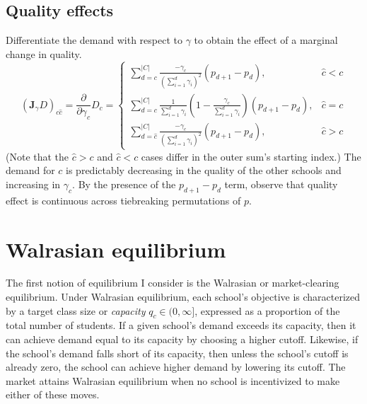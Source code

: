 \documentclass[12pt]{article}
\numberwithin{equation}{subsection}
\theoremstyle{definition}
\begin{document}
\subsection{Quality effects} \label{unconstrainedqualityeffects}
Differentiate the demand with respect to $\gamma$ to obtain the effect of a marginal change in quality.
\begin{equation} \label{jac-gamma-demand-uncons}
\left(\mathbf{J}_\gamma D \right)_{c\hat c} =
\frac{\partial}{\partial\gamma_{\hat c}} D_c = \begin{cases}
\sum_{d=c}^{|C|} \frac{-\gamma_c}{\left(\sum_{i=1}^{d} \gamma_i \right)^2} \left(p_{d+1} - p_d \right), & \hat c < c \\
\sum_{d=c}^{|C|} \frac{1}{\sum_{i=1}^{d} \gamma_i}
    \left( 1 - \frac{\gamma_c}{\sum_{i=1}^{d}\gamma_i }\right)
    \left(p_{d+1} - p_d \right), & \hat c = c\\
\sum_{d=\hat c}^{|C|} \frac{-\gamma_c}{\left(\sum_{i=1}^{d}\gamma_i \right)^2} \left(p_{d+1} - p_d \right), & \hat c > c
\end{cases}
\end{equation}
(Note that the $\hat c > c$ and $ \hat c < c$ cases differ in the outer sum's starting index.) The demand for $c$ is predictably decreasing in the quality of the other schools and increasing in $\gamma_c$. %
By the presence of the $p_{d+1} - p_d$ term, observe that quality effect is continuous across tiebreaking permutations of $p$.




\section{Walrasian equilibrium}
The first notion of equilibrium I consider is the Walrasian or market-clearing equilibrium. Under Walrasian equilibrium, each school's objective is characterized by a target class size or \emph{capacity} $q_c \in (0, \infty]$, expressed as a proportion of the total number of students. If a given school's demand exceeds its capacity, then it can achieve demand equal to its capacity by choosing a higher cutoff. Likewise, if the school's demand falls short of its capacity, then unless the school's cutoff is already zero, the school can achieve higher demand by lowering its cutoff. The market attains Walrasian equilibrium when no school is incentivized to make either of these moves.
\end{document}
